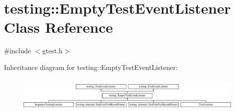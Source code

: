 \hypertarget{classtesting_1_1_empty_test_event_listener}{\section{testing\-:\-:Empty\-Test\-Event\-Listener Class Reference}
\label{classtesting_1_1_empty_test_event_listener}
}


{\ttfamily \#include $<$gtest.\-h$>$}

Inheritance diagram for testing\-:\-:Empty\-Test\-Event\-Listener\-:\begin{figure}[H]
\begin{center}
\leavevmode
\includegraphics[height=1.700405cm]{classtesting_1_1_empty_test_event_listener}
\end{center}
\end{figure}
